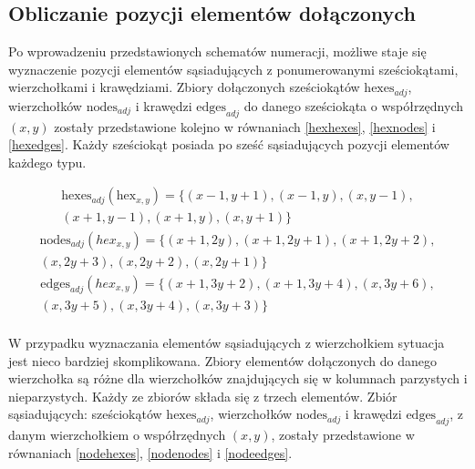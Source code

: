 \documentclass[11pt,twoside]{report}
\begin{document}
\subsection{Obliczanie pozycji elementów dołączonych}
\label{sec:calculations}
Po wprowadzeniu przedstawionych schematów numeracji, możliwe staje się
wyznaczenie pozycji elementów sąsiadujących z ponumerowanymi
sześciokątami, wierzchołkami i krawędziami. Zbiory dołączonych
sześciokątów $\text{hexes}_{adj}$, wierzchołków $\text{nodes}_{adj}$ i
krawędzi $\text{edges}_{adj}$ do danego sześciokąta o współrzędnych
$(x, y)$ zostały przedstawione kolejno w równaniach \ref{hexhexes},
\ref{hexnodes} i \ref{hexedges}. Każdy sześciokąt posiada po sześć
sąsiadujących pozycji elementów każdego typu.

\begin{equation}
  \begin{aligned}
    \text{hexes}_{adj}(\text{hex}_{x,y})=
    \{
    (x-1, y+1),
    (x-1, y),
    (x, y-1),\\
    (x+1, y-1),
    (x+1, y),
    (x, y+1)
    \}
  \end{aligned}
  \label{hexhexes}
\end{equation}
\begin{equation}
  \begin{aligned}
    \text{nodes}_{adj}(hex_{x,y})=\{
    (x+1, 2y),
    (x+1, 2y+1),
    (x+1, 2y+2),\\
    (x, 2y+3),
    (x, 2y+2),
    (x, 2y+1)
    \}
  \end{aligned}
  \label{hexnodes}
\end{equation}
\begin{equation}
  \begin{aligned}
    \text{edges}_{adj}(hex_{x,y})=\{
    (x+1, 3y+2),
    (x+1, 3y+4),
    (x, 3y+6),\\
    (x, 3y+5),
    (x, 3y+4),
    (x, 3y+3)
    \}
  \end{aligned}
  \label{hexedges}
\end{equation} \\

W przypadku wyznaczania elementów sąsiadujących z wierzchołkiem
sytuacja jest nieco bardziej skomplikowana. Zbiory elementów
dołączonych do danego wierzchołka są różne dla wierzchołków
znajdujących się w kolumnach parzystych i nieparzystych. Każdy ze
zbiorów składa się z trzech elementów. Zbiór sąsiadujących:
sześciokątów $\text{hexes}_{adj}$, wierzchołków $\text{nodes}_{adj}$ i
krawędzi $\text{edges}_{adj}$, z danym wierzchołkiem o współrzędnych
$(x, y)$, zostały przedstawione w równaniach \ref{nodehexes},
\ref{nodenodes} i \ref{nodeedges}.
\end{document}
